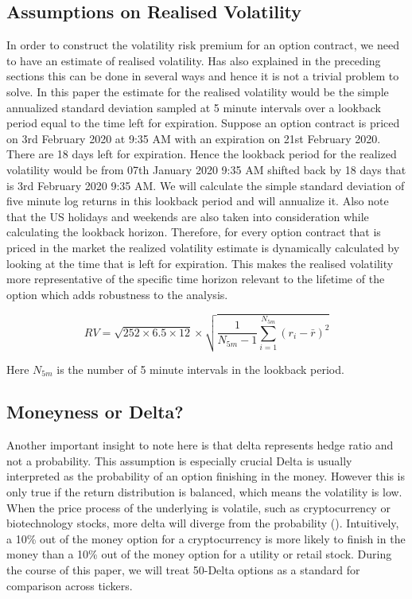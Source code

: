 \subsection{Assumptions on Realised Volatility}
In order to construct the volatility risk premium for an option contract, we need to have an estimate of realised volatility. Has also explained in the preceding sections this can be done in several ways and hence it is not a trivial problem to solve. In this paper the estimate for the realised volatility would be the simple annualized standard deviation sampled at 5 minute intervals over a lookback period equal to the time left for expiration. 
Suppose an option contract is priced on 3rd February 2020 at 9:35 AM with an expiration on 21st February 2020. There are 18 days left for expiration. Hence the lookback period for the realized volatility would be from 07th January 2020 9:35 AM shifted back by 18 days that is 3rd February 2020 9:35 AM. We will calculate the simple standard deviation of five minute log returns in this lookback period and will annualize it. Also note that the US holidays and weekends are also taken into consideration while calculating the lookback horizon. Therefore, for every option contract that is priced in the market the realized volatility estimate is dynamically calculated by looking at the time that is left for expiration. This makes the realised volatility more representative of the specific time horizon relevant to the lifetime of the option which adds robustness to the analysis.

$$ RV= \sqrt{252 \times 6.5 \times 12} \times \sqrt{\frac{1}{N_{5m}-1} \sum_{i=1}^{N_{5m}} (r_i - \bar{r})^2} $$  

Here $N_{5m}$ is the number of 5 minute intervals in the lookback period.

\subsection{Moneyness or Delta?}
Another important insight to note here is that delta represents hedge ratio and not a probability. This assumption is especially crucial  Delta is usually interpreted as the probability of an option finishing in the money. However this is only true if the return distribution is balanced, which means the volatility is low.  When the price process of the underlying is volatile, such as cryptocurrency or biotechnology stocks, more delta will diverge from the probability (\cite{abdelmessih2020lessons}).  Intuitively, a 10\% out of the money option for a cryptocurrency is more likely to finish in the money than a 10\% out of the money option for a utility or retail stock. During the course of this paper, we will treat 50-Delta options as a standard for comparison across tickers. 



